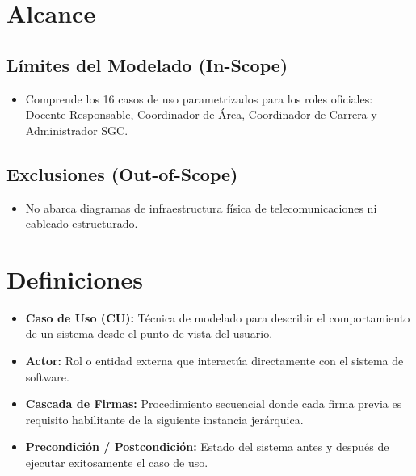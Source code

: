 \documentclass[12pt,a4paper]{article}
\begin{document}
\section{Alcance}

\subsection{Límites del Modelado (In-Scope)}
\begin{itemize}[leftmargin=1.5em, itemsep=2pt]
    \item Comprende los 16 casos de uso parametrizados para los roles oficiales: Docente Responsable, Coordinador de Área, Coordinador de Carrera y Administrador SGC.
\end{itemize}

\subsection{Exclusiones (Out-of-Scope)}
\begin{itemize}[leftmargin=1.5em, itemsep=2pt]
    \item No abarca diagramas de infraestructura física de telecomunicaciones ni cableado estructurado.
\end{itemize}

\section{Definiciones}
\begin{itemize}[leftmargin=1.5em, itemsep=2pt]
    \item \textbf{Caso de Uso (CU):} Técnica de modelado para describir el comportamiento de un sistema desde el punto de vista del usuario.
    \item \textbf{Actor:} Rol o entidad externa que interactúa directamente con el sistema de software.
    \item \textbf{Cascada de Firmas:} Procedimiento secuencial donde cada firma previa es requisito habilitante de la siguiente instancia jerárquica.
    \item \textbf{Precondición / Postcondición:} Estado del sistema antes y después de ejecutar exitosamente el caso de uso.
\end{itemize}
\end{document}
